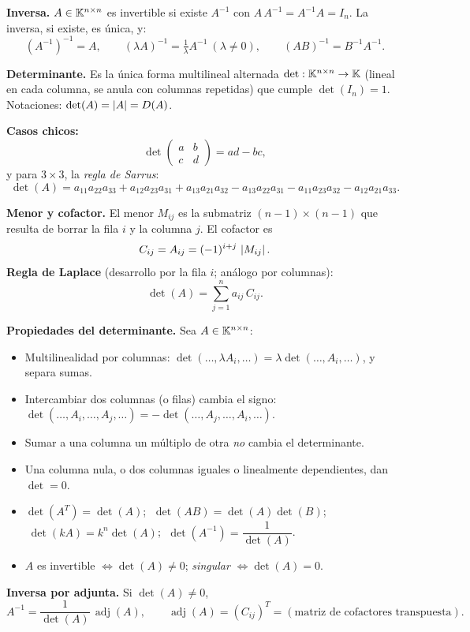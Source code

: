 \begin{teoria}
\textbf{Inversa.} $A \in \mathbb{K}^{n\times n}$ es invertible si existe $A^{-1}$ con $A\,A^{-1} = A^{-1}A = I_n$. La inversa, si existe, es única, y:
\[
(A^{-1})^{-1} = A, \qquad (\lambda A)^{-1} = \tfrac{1}{\lambda}A^{-1}\ (\lambda\neq0), \qquad (AB)^{-1} = B^{-1}A^{-1}.
\]
\end{teoria}

\begin{teoria}
\textbf{Determinante.} Es la única forma multilineal alternada $\det:\mathbb{K}^{n\times n}\to\mathbb{K}$ (lineal en cada columna, se anula con columnas repetidas) que cumple $\det(I_n)=1$. Notaciones: $\det(A) = \left\lvert A \right\rvert = D(A)$.

\smallskip
\textbf{Casos chicos:}
\[
\det\begin{pmatrix} a & b \\ c & d \end{pmatrix} = ad - bc,
\]
y para $3\times 3$, la \emph{regla de Sarrus}:
\[
\det(A) = a_{11}a_{22}a_{33} + a_{12}a_{23}a_{31} + a_{13}a_{21}a_{32} - a_{13}a_{22}a_{31} - a_{11}a_{23}a_{32} - a_{12}a_{21}a_{33}.
\]

\smallskip
\textbf{Menor y cofactor.} El menor $M_{ij}$ es la submatriz $(n-1)\times(n-1)$ que resulta de borrar la fila $i$ y la columna $j$. El cofactor es
\[
C_{ij} = A_{ij} = (-1)^{i+j}\,\left\lvert M_{ij} \right\rvert.
\]
\textbf{Regla de Laplace} (desarrollo por la fila $i$; análogo por columnas):
\[
\det(A) = \sum_{j=1}^{n} a_{ij}\,C_{ij}.
\]
\end{teoria}

\begin{teoria}
\textbf{Propiedades del determinante.} Sea $A \in \mathbb{K}^{n\times n}$:
\begin{itemize}
  \item Multilinealidad por columnas: $\det(\dots, \lambda A_i, \dots) = \lambda\det(\dots,A_i,\dots)$, y separa sumas.
  \item Intercambiar dos columnas (o filas) cambia el signo: $\det(\dots,A_i,\dots,A_j,\dots) = -\det(\dots,A_j,\dots,A_i,\dots)$.
  \item Sumar a una columna un múltiplo de otra \emph{no} cambia el determinante.
  \item Una columna nula, o dos columnas iguales o linealmente dependientes, dan $\det = 0$.
  \item $\det(A^T) = \det(A)$; $\;\det(AB) = \det(A)\det(B)$; $\;\det(kA) = k^n\det(A)$; $\;\det(A^{-1}) = \dfrac{1}{\det(A)}$.
  \item $A$ es invertible $\iff \det(A)\neq0$; \emph{singular} $\iff \det(A)=0$.
\end{itemize}
\textbf{Inversa por adjunta.} Si $\det(A)\neq0$,
\[
A^{-1} = \frac{1}{\det(A)}\,\operatorname{adj}(A), \qquad \operatorname{adj}(A) = (C_{ij})^T = (\text{matriz de cofactores transpuesta}).
\]
\end{teoria}

